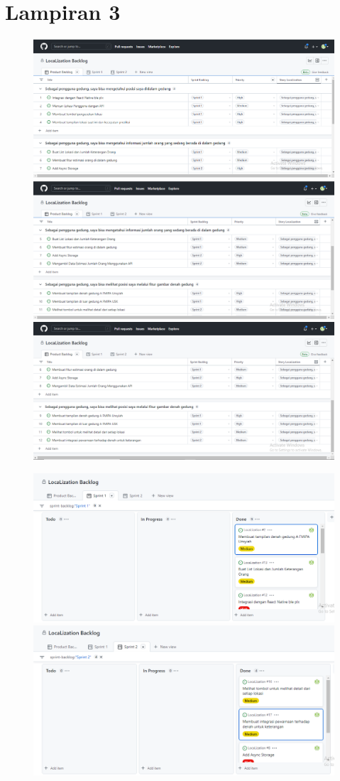 \chapter*{Lampiran 3}
\begin{figure}[htp]
  \centering
  \includegraphics[width=.4\textwidth]{gambar/lampiran/scrum1.PNG}\quad
  \vspace{0.4cm}
  \includegraphics[width=.4\textwidth]{gambar/lampiran/scrum2.PNG}\quad
  \vspace{0.4cm}
  \includegraphics[width=.4\textwidth]{gambar/lampiran/scrum3.PNG}

  \vspace{0.4cm}

  \includegraphics[width=.4\textwidth]{gambar/lampiran/sprint1.PNG}\quad
  \vspace{0.4cm}
  \includegraphics[width=.4\textwidth]{gambar/lampiran/sprint2.PNG}

  \label{sus-mahasiswa}
\end{figure}


